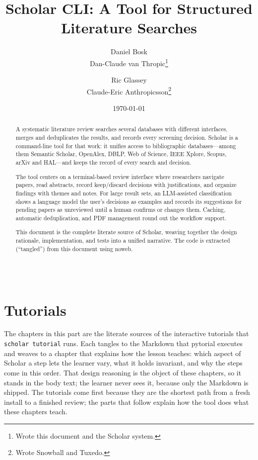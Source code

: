 \documentclass[a4paper,oneside]{memoir}
\title{Scholar CLI: A Tool for Structured Literature Searches}
\author{Daniel Bosk\\Dan-Claude van Thropic\thanks{%
    Wrote this document and the Scholar system.
  } \and
  Ric Glassey\\Claude-Eric Anthropicsson\thanks{%
    Wrote Snowball and Tuxedo.
  }
}
\date{\today}
\begin{document}
\frontmatter
\maketitle

\begin{abstract}
A systematic literature review searches several databases with
different interfaces, merges and deduplicates the results, and records
every screening decision.
Scholar is a command-line tool for that work: it unifies access to
bibliographic databases---among them Semantic Scholar, OpenAlex,
DBLP, Web of Science, IEEE Xplore, Scopus, arXiv and HAL---and keeps the
record of every search and decision.

The tool centers on a terminal-based review interface where researchers
navigate papers, read abstracts, record keep/discard decisions with
justifications, and organize findings with themes and notes.
For large result sets, an LLM-assisted classification shows a language
model the user's decisions as examples and records its suggestions for
pending papers as unreviewed until a human confirms or changes them.
Caching, automatic deduplication, and PDF management round out
the workflow support.

This document is the complete literate source of Scholar, weaving together
the design rationale, implementation, and tests into a unified narrative.
The code is extracted (``tangled'') from this document using noweb.
\end{abstract}
\vfill
\inputminted[linenos=false]{text}{../LICENSE}

\clearpage
\tableofcontents*

\mainmatter



\part{Tutorials}

The chapters in this part are the literate sources of the interactive
tutorials that \texttt{scholar tutorial} runs.
Each tangles to the Markdown that pytorial executes and weaves to a
chapter that explains how the lesson teaches: which aspect of Scholar a
step lets the learner vary, what it holds invariant, and why the steps
come in this order.
That design reasoning is the object of these chapters, so it stands in
the body text; the learner never sees it, because only the Markdown is
shipped.
The tutorials come first because they are the shortest path from a fresh
install to a finished review; the parts that follow explain how the tool
does what these chapters teach.
\end{document}
